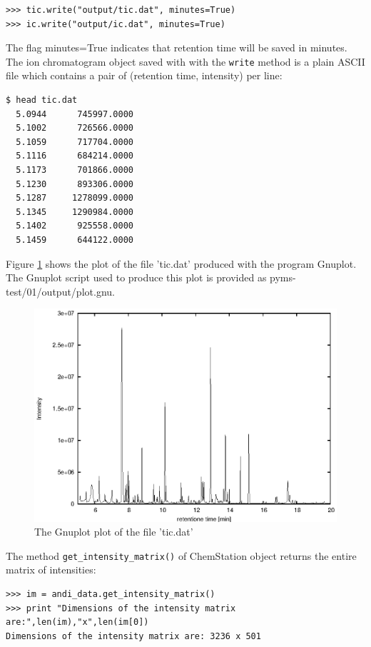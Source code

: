 \begin{verbatim}
>>> tic.write("output/tic.dat", minutes=True)
>>> ic.write("output/ic.dat", minutes=True)
\end{verbatim}

\noindent
The flag minutes=True indicates that retention time will be saved in minutes.
The ion chromatogram object saved with with the {\tt write{}} method is a
plain ASCII file which contains a pair of (retention time, intensity) per
line:

\begin{verbatim}
$ head tic.dat
  5.0944      745997.0000
  5.1002      726566.0000
  5.1059      717704.0000
  5.1116      684214.0000
  5.1173      701866.0000
  5.1230      893306.0000
  5.1287     1278099.0000
  5.1345     1290984.0000
  5.1402      925558.0000
  5.1459      644122.0000
\end{verbatim}

\noindent
Figure \ref{fig:tic-plot} shows the plot of the file 'tic.dat' produced with the
program Gnuplot. The Gnuplot script used to produce this plot is provided
as pyms-test/01/output/plot.gnu.

\begin{figure}[htp]
\begin{center}
\includegraphics{graphics/pyms-test/tic.eps}
\caption{The Gnuplot plot of the file 'tic.dat'}
\label{fig:tic-plot}
\end{center}
\end{figure}

The method {\tt get\_intensity\_matrix()} of ChemStation object returns
the entire matrix of intensities:

\begin{verbatim}
>>> im = andi_data.get_intensity_matrix()
>>> print "Dimensions of the intensity matrix are:",len(im),"x",len(im[0])
Dimensions of the intensity matrix are: 3236 x 501
\end{verbatim}

